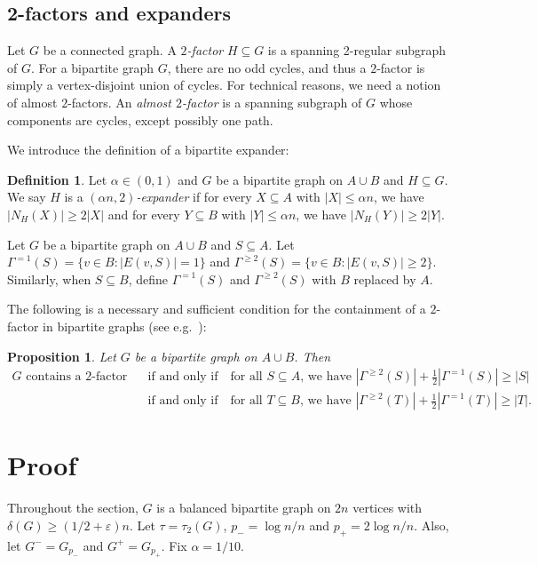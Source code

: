 \documentclass[reqno,final,a4paper]{amsart}
\numberwithin{equation}{section}
\newtheorem{proposition}[theorem]{Proposition}
\theoremstyle{definition}
\newtheorem{definition}[theorem]{Definition}
\theoremstyle{remark}
\newcommand{\eps}{\varepsilon}
\begin{document}
\subsection{2-factors and expanders}\label{sec:2-factor}
Let $G$ be a connected graph.
A \emph{$2$-factor} $H\subseteq G$ is a spanning 2-regular subgraph of $G$. For a bipartite graph $G$, there are no odd cycles, and thus a $2$-factor is simply a vertex-disjoint union of cycles.
For technical reasons, we need a notion of almost $2$-factors.
An \emph{almost $2$-factor} is a spanning subgraph of $G$ whose components are cycles, except possibly one path.

We introduce the definition of a bipartite expander:
\begin{definition}
    Let $\alpha \in (0,1)$ and $G$ be a bipartite graph on $A\cup B$ and $H\subseteq G$. We say $H$ is a \emph{$(\alpha n, 2)$-expander} if for every $X\subseteq A$ with $|X|\leq \alpha n$, we have $|N_H(X)|\geq 2|X|$ and for every $Y\subseteq B$ with $|Y|\leq \alpha n$, we have $|N_H(Y)|\geq 2|Y|$.
\end{definition}
Let $G$ be a bipartite graph on $A\cup B$ and $S\subseteq A$. Let $\Gamma^{=1}(S) = \{v\in B: |E(v,S)| = 1\}$ and $\Gamma^{\geq 2}(S) = \{v\in B: |E(v,S)| \geq 2\}$. Similarly, when $S\subseteq B$, define $\Gamma^{=1}(S)$ and $\Gamma^{\geq 2}(S)$ with $B$ replaced by $A$.

The following is a necessary and sufficient condition for the containment of a $2$-factor in bipartite graphs (see e.g.~\cite[Lemma 5]{Bollobas-Kohayakawa}):
\begin{proposition}\label{prop:contain-2-factor}
    Let $G$ be a bipartite graph on $A\cup B$.
    Then 
    \begin{align*}
        \text{$G$ contains a $2$-factor} \quad\quad &\text{if and only if} \quad \text{for all $S\subseteq A$, we have $|\Gamma^{\geq 2}(S)| + \frac{1}{2}|\Gamma^{=1}(S)| \geq |S|$ }\\
        &\text{if and only if} \quad\text{for all $T\subseteq B$, we have $|\Gamma^{\geq 2}(T)| + \frac{1}{2}|\Gamma^{=1}(T)| \geq |T|$.}
    \end{align*}
\end{proposition}

\section{Proof}
Throughout the section, $G$ is a balanced bipartite graph on $2n$ vertices with $\delta(G) \geq (1/2+\eps)n$.
Let $\tau = \tau_2(G)$, $p_- = \log n/n$ and $p_+ = 2\log n/n$. 
Also, let $G^- = G_{p_-}$ and $G^+ = G_{p_+}$. Fix $\alpha = 1/10$.
\end{document}
